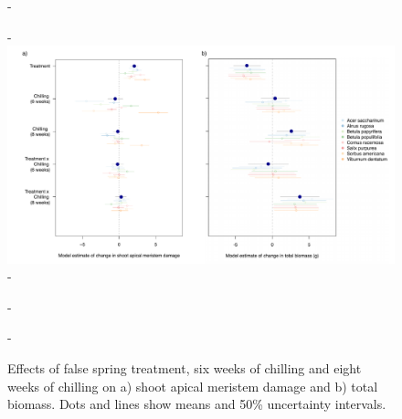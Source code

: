 \documentclass{article}\usepackage[]{graphicx}\usepackage[]{color}
\begin{document}
  {\begin{figure} [H]
  -\begin{center}
  -\includegraphics[width=18cm]{..//analyses/figures/mu_growth.pdf} 
  -\caption{Effects of false spring treatment, six weeks of chilling and eight weeks of chilling on a) shoot apical meristem damage and b) total biomass. Dots and lines show means and 50\% uncertainty intervals. }\label{fig:mugrowth}
  -\end{center}
  -\end{figure}}
  
  
\end{document}
